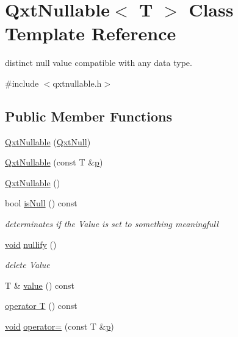 \hypertarget{class_qxt_nullable}{\section{Qxt\-Nullable$<$ T $>$ Class Template Reference}
\label{class_qxt_nullable}
}


distinct null value compatible with any data type.  




{\ttfamily \#include $<$qxtnullable.\-h$>$}

\subsection*{Public Member Functions}
\begin{DoxyCompactItemize}
\item 
\hyperlink{class_qxt_nullable_adfb8780ec8cbe55bfe3b614f69493e6d}{Qxt\-Nullable} (\hyperlink{struct_qxt_null}{Qxt\-Null})
\item 
\hyperlink{class_qxt_nullable_a06fb510df024038448b6bf267e22425b}{Qxt\-Nullable} (const T \&\hyperlink{glext_8h_aa5367c14d90f462230c2611b81b41d23}{p})
\item 
\hyperlink{class_qxt_nullable_a3a2fbd1917cd6734e87ac49a1f4ccf9f}{Qxt\-Nullable} ()
\item 
bool \hyperlink{class_qxt_nullable_a69eab17adef45e953e1eb2a11e8304e5}{is\-Null} () const 
\begin{DoxyCompactList}\small\item\em determinates if the Value is set to something meaningfull \end{DoxyCompactList}\item 
\hyperlink{group___u_a_v_objects_plugin_ga444cf2ff3f0ecbe028adce838d373f5c}{void} \hyperlink{class_qxt_nullable_a0e7d77f807c44a181f2d109e7f2ae28a}{nullify} ()
\begin{DoxyCompactList}\small\item\em delete Value \end{DoxyCompactList}\item 
T \& \hyperlink{class_qxt_nullable_ae42cbd2d9f2a5eaa3a2263679e2733bc}{value} () const 
\item 
\hyperlink{class_qxt_nullable_ad09bf6b53683e0f3a4cee773ca4297c8}{operator T} () const 
\item 
\hyperlink{group___u_a_v_objects_plugin_ga444cf2ff3f0ecbe028adce838d373f5c}{void} \hyperlink{class_qxt_nullable_ac2311c9b9893d6a04cb3804762e3a3fd}{operator=} (const T \&\hyperlink{glext_8h_aa5367c14d90f462230c2611b81b41d23}{p})
\end{DoxyCompactItemize}
